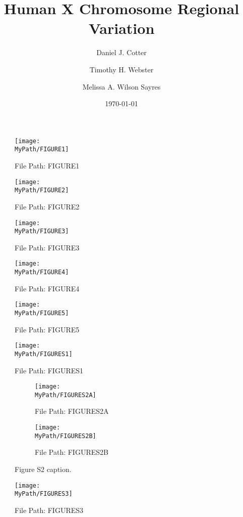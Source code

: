 \documentclass[12pt]{article}
\title{Human X Chromosome Regional Variation}
\author[1]{Daniel J. Cotter}
\author[1]{Timothy H. Webster}
\author[1]{Melissa A. Wilson Sayres}
\affil[1]{Arizona State University}
\date{\today}
\newcommand*{\MyPath}{..}
\newcommand{\beginsupplement}{%
        \setcounter{table}{0}
        \renewcommand{\thetable}{S\arabic{table}}%
        \setcounter{figure}{0}
        \renewcommand{\thefigure}{S\arabic{figure}}%
     }
\begin{document}
\maketitle

\begin{abstract}

\end{abstract}

\begin{figure}
  \texttt{[image: \\MyPath/FIGURE1]}
  \caption{File Path: FIGURE1}
  \label{fig:fig1}
\end{figure}

\begin{figure}
  \texttt{[image: \\MyPath/FIGURE2]}
  \caption{File Path: FIGURE2}
  \label{fig:fig2}
\end{figure}

\begin{figure}
  \texttt{[image: \\MyPath/FIGURE3]}
  \caption{File Path: FIGURE3}
  \label{fig:fig3}
\end{figure}

\begin{figure}
  \texttt{[image: \\MyPath/FIGURE4]}
  \caption{File Path: FIGURE4}
  \label{fig:fig4}
\end{figure}

\begin{figure}
  \texttt{[image: \\MyPath/FIGURE5]}
  \caption{File Path: FIGURE5}
  \label{fig:fig5}
\end{figure}

\beginsupplement

\begin{figure}
  \texttt{[image: \\MyPath/FIGURES1]}
  \caption{File Path: FIGURES1}
  \label{fig:figS1}
\end{figure}

\begin{figure}[h!]
  \centering
  \begin{subfigure}[b]{0.4\linewidth}
    \texttt{[image: \\MyPath/FIGURES2A]}
    \caption{File Path: FIGURES2A}
  \end{subfigure}
  \begin{subfigure}[b]{0.4\linewidth}
    \texttt{[image: \\MyPath/FIGURES2B]}
    \caption{File Path: FIGURES2B}
  \end{subfigure}
  \caption{Figure S2 caption.}
  \label{fig:figS2}
\end{figure}

\begin{figure}
  \texttt{[image: \\MyPath/FIGURES3]}
  \caption{File Path: FIGURES3}
  \label{fig:figS3}
\end{figure}
\end{document}
